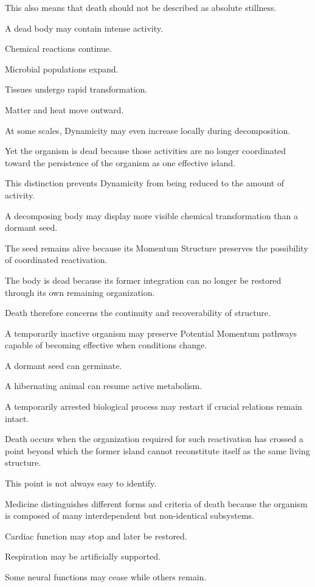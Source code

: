 This also means that death should not be described as absolute stillness.

A dead body may contain intense activity.

Chemical reactions continue.

Microbial populations expand.

Tissues undergo rapid transformation.

Matter and heat move outward.

At some scales, Dynamicity may even increase locally during decomposition.

Yet the organism is dead because those activities are no longer coordinated toward the persistence of the organism as one effective island.

This distinction prevents Dynamicity from being reduced to the amount of activity.

A decomposing body may display more visible chemical transformation than a dormant seed.

The seed remains alive because its Momentum Structure preserves the possibility of coordinated reactivation.

The body is dead because its former integration can no longer be restored through its own remaining organization.

Death therefore concerns the continuity and recoverability of structure.

A temporarily inactive organism may preserve Potential Momentum pathways capable of becoming effective when conditions change.

A dormant seed can germinate.

A hibernating animal can resume active metabolism.

A temporarily arrested biological process may restart if crucial relations remain intact.

Death occurs when the organization required for such reactivation has crossed a point beyond which the former island cannot reconstitute itself as the same living structure.

This point is not always easy to identify.

Medicine distinguishes different forms and criteria of death because the organism is composed of many interdependent but non-identical subsystems.

Cardiac function may stop and later be restored.

Respiration may be artificially supported.

Some neural functions may cease while others remain.

